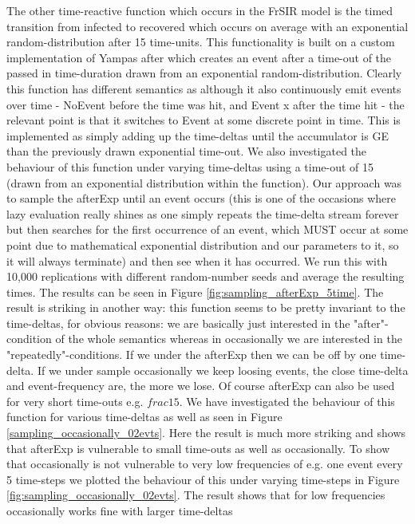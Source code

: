 The other time-reactive function which occurs in the FrSIR model is the timed transition from infected to recovered which occurs on average with an exponential random-distribution after 15 time-units. This functionality is built on a custom implementation of Yampas after which creates an event after a time-out of the passed in time-duration drawn from an exponential random-distribution. Clearly this function has different semantics as although it also continuously emit events over time - NoEvent before the time was hit, and Event x after the time hit - the relevant point is that it switches to Event at some discrete point in time. This is implemented as simply adding up the time-deltas until the accumulator is GE than the previously drawn exponential time-out. We also investigated the behaviour of this function under varying time-deltas using a time-out of 15 (drawn from an exponential distribution within the function). Our approach was to sample the afterExp until an event occurs (this is one of the occasions where lazy evaluation really shines as one simply repeats the time-delta stream forever but then searches for the first occurrence of an event, which MUST occur at some point due to mathematical exponential distribution and our parameters to it, so it will always terminate) and then see when it has occurred. We run this with 10,000 replications with different random-number seeds and average the resulting times. The results can be seen in Figure \ref{fig:sampling_afterExp_5time}. The result is striking in another way: this function seems to be pretty invariant to the time-deltas, for obvious reasons: we are basically just interested in the "after"-condition of the whole semantics whereas in occasionally we are interested in the "repeatedly"-conditions. If we under the afterExp then we can be off by one time-delta. If we under sample occasionally we keep loosing events, the close time-delta and event-frequency are, the more we lose. Of course afterExp can also be used for very short time-outs e.g. $frac{1}{5}$. We have investigated the behaviour of this function for various time-deltas as well as seen in Figure \ref{sampling_occasionally_02evts}. Here the result is much more striking and shows that afterExp is vulnerable to small time-outs as well as occasionally. 
To show that occasionally is not vulnerable to very low frequencies of e.g. one event every 5 time-steps we plotted the behaviour of this under varying time-steps in Figure \ref{fig:sampling_occasionally_02evts}. The result shows that for low frequencies occasionally works fine with larger time-deltas

